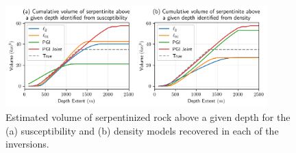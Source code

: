 \begin{figure}
    \begin{center}
    \includegraphics[width=0.9\textwidth]{figures/volume-depth.png}
    \end{center}
\caption{
    Estimated volume of serpentinized rock above a given depth for the (a) susceptibility and (b) density models recovered in each of the inversions.
}
\label{fig:volume-depth}
\end{figure}
